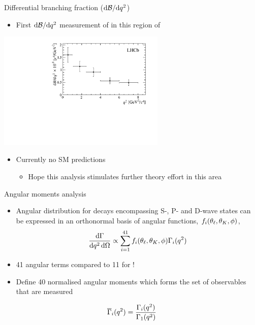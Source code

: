 \documentclass[aspectratio=1610]{beamer}
\begin{document}
\begin{frame}{Differential branching fraction ($\mathrm{d}{\mathcal{B}}/\mathrm{d}{q^2}$)}

\begin{itemize}
\item First $\mathrm{d}{\mathcal{B}}/\mathrm{d}{q^2}$ measurement of \BdToKpimm in this region of \mkpi 
\end{itemize}

\begin{center}
\includegraphics[width=0.6\textwidth]{figs/kpimm/bf/dbfdq2.pdf}
\end{center}

\begin{itemize}
\item Currently no SM predictions
\begin{itemize}
\item[\ding{80}] Hope this analysis stimulates further theory effort in this area
\end{itemize}
\end{itemize}

\end{frame}

\begin{frame}{Angular moments analysis}

\begin{itemize}
\item Angular distribution for \BdToKpimm decays encompassing S-, P- and D-wave \Kstar states can be expressed in an orthonormal basis of angular functions, $f_i(\theta_\ell,\theta_K,\phi)$,
\begin{equation*}
\frac{\mathrm{d}\Gamma }{\mathrm{d}{q^2}\,\mathrm{d}\Omega} \propto \sum^{41}_{i=1} f_i (\theta_\ell,\theta_K,\phi) \Gamma_i({q^2})
\end{equation*}
\item 41 angular terms compared to 11 for \BdToKstmmP!
\item Define 40 normalised angular moments which forms the set of observables that are measured
\end{itemize}
\begin{equation*}
\overline{\Gamma}_i({q^2}) = \frac{\Gamma_{i}({q^2})}{\Gamma_{1}({q^2})}
\end{equation*}

\end{frame}
\end{document}
